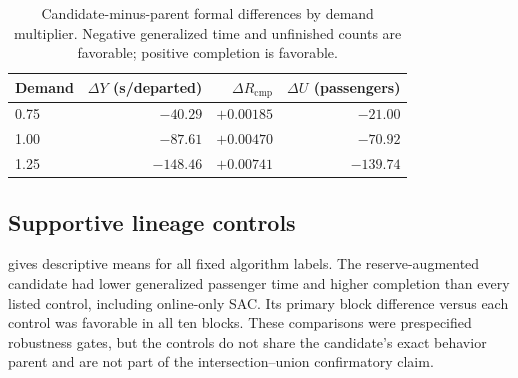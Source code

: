 \begin{table}[t]
\centering
\small
\caption{Candidate-minus-parent formal differences by demand multiplier.
Negative generalized time and unfinished counts are favorable; positive
completion is favorable.}
\label{tab:demand_effect}
\begin{tabular}{lrrr}
\toprule
Demand & $\Delta Y$ (s/departed) & $\Delta R_{\mathrm{cmp}}$ & $\Delta U$ (passengers) \\
\midrule
0.75 & $-40.29$ & $+0.00185$ & $-21.00$ \\
1.00 & $-87.61$ & $+0.00470$ & $-70.92$ \\
1.25 & $-148.46$ & $+0.00741$ & $-139.74$ \\
\bottomrule
\end{tabular}
\end{table}

\subsection{Supportive lineage controls}
\label{sec:exp:controls}

 gives descriptive means for all fixed algorithm
labels. The reserve-augmented candidate had lower generalized passenger time and
higher completion than every listed control, including online-only SAC. Its
primary block difference versus each control was favorable in all ten blocks.
These comparisons were prespecified robustness gates, but the controls do not
share the candidate's exact behavior parent and are not part of the
intersection--union confirmatory claim.

\begin{table}[t]
\centering
\small
\caption{Descriptive formal means for the fixed candidate, direct parent, raw
actor, and lineage controls. Bold denotes the best displayed mean.}
\label{tab:formal_controls}
\end{table}

